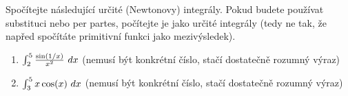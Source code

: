 Spočítejte následující určité (Newtonovy) integrály.
Pokud budete používat substituci nebo per partes, počítejte je jako určité integrály (tedy ne tak, že napřed spočítáte primitivní funkci jako mezivýsledek).
\begin{enumerate}

	\item  $\int_{2}^{5} \frac{\sin(1/x)}{x^2} \ dx$ (nemusí být konkrétní číslo, stačí dostatečně rozumný výraz)

	\item  $\int_{3}^{5} x \cos(x) \ dx$ (nemusí být konkrétní číslo, stačí dostatečně rozumný výraz)

\end{enumerate}

